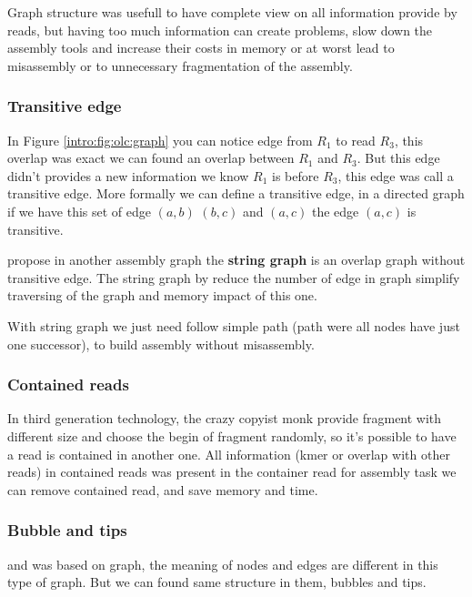 \documentclass[./main.tex]{subfiles}
\begin{document}
Graph structure was usefull to have complete view on all information provide by reads, but having too much information can create problems, slow down the assembly tools and increase their costs in memory or at worst lead to misassembly or to unnecessary fragmentation of the assembly.

\subsubsection{Transitive edge}  \label{intro:subsubsec:transitive_edge}

In Figure \ref{intro:fig:olc:graph} you can notice edge from $R_1$ to read $R_3$, this overlap was exact we can found an overlap between $R_1$ and $R_3$. But this edge didn't provides a new information we know $R_1$ is before $R_3$, this edge was call a transitive edge. More formally we can define a transitive edge, in a directed graph if we have this set of edge $(a, b)$ $(b, c)$ and $(a, c)$ the edge $(a, c)$ is transitive.

\citeauthor{string_graph} propose in \cite{string_graph} another assembly graph the \textbf{string graph} is an overlap graph without transitive edge. The string graph by reduce the number of edge in graph simplify traversing of the graph and memory impact of this one.

With string graph we just need follow simple path (path were all nodes have just one successor), to build assembly without misassembly.

\subsubsection{Contained reads} \label{intro:subsubsec:contained_reads}

In third generation technology, the crazy copyist monk provide fragment with different size and choose the begin of fragment randomly, so it's possible to have a read is contained in another one. All information (kmer or overlap with other reads) in contained reads was present in the container read for assembly task we can remove contained read, and save memory and time.

\subsubsection{Bubble and tips} \label{intro:subsubsec:bubble_tips}

\OLC and \DBG was based on graph, the meaning of nodes and edges are different in this type of graph. But we can found same structure in them, bubbles and tips.
\end{document}
